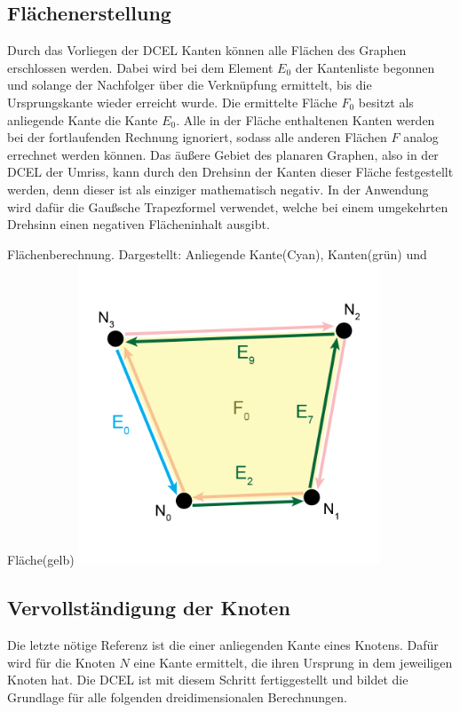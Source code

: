 \subsection{Flächenerstellung}
Durch das Vorliegen der DCEL Kanten können alle Flächen des Graphen erschlossen werden.
Dabei wird bei dem Element $E_0$ der Kantenliste begonnen und solange der Nachfolger über die Verknüpfung ermittelt, bis die Ursprungskante wieder erreicht wurde.
Die ermittelte Fläche $F_0$ besitzt als anliegende Kante die Kante $E_0$.
Alle in der Fläche enthaltenen Kanten werden bei der fortlaufenden Rechnung ignoriert, sodass alle anderen Flächen $F$ analog errechnet werden können.
Das äußere Gebiet des planaren Graphen, also in der DCEL der Umriss, kann durch den Drehsinn der Kanten dieser Fläche festgestellt werden, denn dieser ist als einziger mathematisch negativ.
In der Anwendung wird dafür die Gaußsche Trapezformel verwendet, welche bei einem umgekehrten Drehsinn einen negativen Flächeninhalt ausgibt.

\begin{Bild}{Flächenberechnung. Dargestellt: Anliegende Kante(Cyan), Kanten(grün) und Fläche(gelb)}
	\includegraphics[width = 90mm]{Bilder/FlaecheBerechnung}
\end{Bild}

\subsection{Vervollständigung der Knoten}
Die letzte nötige Referenz ist die einer anliegenden Kante eines Knotens.
Dafür wird für die Knoten $N$ eine Kante ermittelt, die ihren Ursprung in dem jeweiligen Knoten hat.
Die DCEL ist mit diesem Schritt fertiggestellt und bildet die Grundlage für alle folgenden dreidimensionalen Berechnungen.\label{key}
